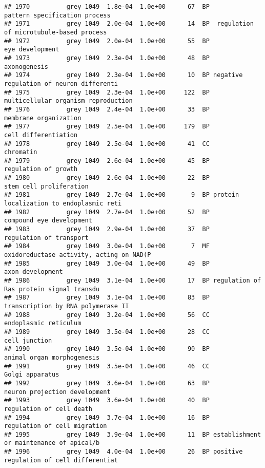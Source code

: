 \documentclass[]{article}
\begin{document}
\begin{verbatim}
## 1970          grey 1049  1.8e-04  1.0e+00      67  BP            pattern specification process
## 1971          grey 1049  2.0e-04  1.0e+00      14  BP  regulation of microtubule-based process
## 1972          grey 1049  2.0e-04  1.0e+00      55  BP                          eye development
## 1973          grey 1049  2.3e-04  1.0e+00      48  BP                             axonogenesis
## 1974          grey 1049  2.3e-04  1.0e+00      10  BP negative regulation of neuron differenti
## 1975          grey 1049  2.3e-04  1.0e+00     122  BP      multicellular organism reproduction
## 1976          grey 1049  2.4e-04  1.0e+00      33  BP                    membrane organization
## 1977          grey 1049  2.5e-04  1.0e+00     179  BP                     cell differentiation
## 1978          grey 1049  2.5e-04  1.0e+00      41  CC                                chromatin
## 1979          grey 1049  2.6e-04  1.0e+00      45  BP                     regulation of growth
## 1980          grey 1049  2.6e-04  1.0e+00      22  BP                  stem cell proliferation
## 1981          grey 1049  2.7e-04  1.0e+00       9  BP protein localization to endoplasmic reti
## 1982          grey 1049  2.7e-04  1.0e+00      52  BP                 compound eye development
## 1983          grey 1049  2.9e-04  1.0e+00      37  BP                  regulation of transport
## 1984          grey 1049  3.0e-04  1.0e+00       7  MF oxidoreductase activity, acting on NAD(P
## 1985          grey 1049  3.0e-04  1.0e+00      49  BP                         axon development
## 1986          grey 1049  3.1e-04  1.0e+00      17  BP regulation of Ras protein signal transdu
## 1987          grey 1049  3.1e-04  1.0e+00      83  BP       transcription by RNA polymerase II
## 1988          grey 1049  3.2e-04  1.0e+00      56  CC                    endoplasmic reticulum
## 1989          grey 1049  3.5e-04  1.0e+00      28  CC                            cell junction
## 1990          grey 1049  3.5e-04  1.0e+00      90  BP               animal organ morphogenesis
## 1991          grey 1049  3.5e-04  1.0e+00      46  CC                          Golgi apparatus
## 1992          grey 1049  3.6e-04  1.0e+00      63  BP            neuron projection development
## 1993          grey 1049  3.6e-04  1.0e+00      40  BP                 regulation of cell death
## 1994          grey 1049  3.7e-04  1.0e+00      16  BP             regulation of cell migration
## 1995          grey 1049  3.9e-04  1.0e+00      11  BP establishment or maintenance of apical/b
## 1996          grey 1049  4.0e-04  1.0e+00      26  BP positive regulation of cell differentiat

\end{verbatim}
\end{document}
